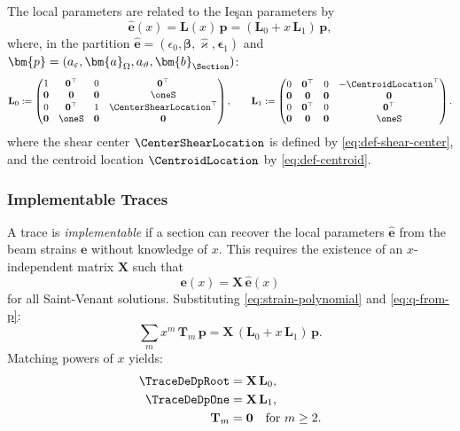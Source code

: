 The local parameters are related to the Ieşan parameters by
\begin{equation}
\hat{\bm{e}}(x) = \mathbf{L}(x)\,\bm{p} = (\mathbf{L}_0 + x\,\mathbf{L}_1)\,\bm{p},
\label{eq:q-from-p}
\end{equation}
where, in the partition $\hat{\bm{e}} = (\epsilon_0, \bm{\beta}, \hat{\varkappa}, \bm{\epsilon}_1)$ 
and $\bm{p} = (a_\varepsilon, \bm{a}_\Omega, a_\vartheta, \bm{b}_{\Section})$:
\begin{equation}
\mathbf{L}_0 := \begin{pmatrix}
1 & \mathbf{0}^\top & 0 & \mathbf{0}^\top \\
\mathbf{0} & \mathbf{0} & \mathbf{0} & \oneS \\
0 & \mathbf{0}^\top & 1 & \CenterShearLocation^\top \\
\mathbf{0} & \oneS & \mathbf{0} & \mathbf{0}
\end{pmatrix}, \qquad
\mathbf{L}_1 := \begin{pmatrix}
0 & \mathbf{0}^\top & 0 & -\CentroidLocation^\top \\
\mathbf{0} & \mathbf{0} & \mathbf{0} & \mathbf{0} \\
0 & \mathbf{0}^\top & 0 & \mathbf{0}^\top \\
\mathbf{0} & \mathbf{0} & \mathbf{0} & \oneS
\end{pmatrix}.
\label{eq:L-matrices}
\end{equation}
where the shear center $\CenterShearLocation$ is defined by \eqref{eq:def-shear-center}, 
and the centroid location $\CentroidLocation$ by \eqref{eq:def-centroid}.

\subsubsection{Implementable Traces}

A trace is \emph{implementable} if a section can recover the local parameters 
$\hat{\bm{e}}$ from the beam strains $\bm{e}$ without knowledge of $x$. This requires 
the existence of an $x$-independent matrix $\mathbf{X}$ such that
\begin{equation}
\bm{e}(x) = \mathbf{X}\,\hat{\bm{e}}(x)
\label{eq:implementable-def}
\end{equation}
for all Saint-Venant solutions. 
%
Substituting \eqref{eq:strain-polynomial} and \eqref{eq:q-from-p}:
\begin{equation}
\sum_m x^m\,\mathbf{T}_m\,\bm{p} = \mathbf{X}\,(\mathbf{L}_0 + x\,\mathbf{L}_1)\,\bm{p}.
\end{equation}
Matching powers of $x$ yields:
\begin{subequations}
\begin{align}
\TraceDeDpRoot &= \mathbf{X}\,\mathbf{L}_0, \label{eq:T0-condition} \\
\TraceDeDpOne &= \mathbf{X}\,\mathbf{L}_1, \label{eq:T1-condition} \\
\mathbf{T}_m &= \mathbf{0} \quad \text{for } m \geq 2. \label{eq:Tm-condition}
\end{align}
\end{subequations}

